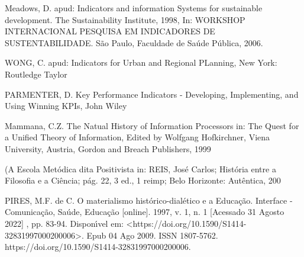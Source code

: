 \documentclass[
12pt,		%
openright,	%
twoside,  %
a4paper,			%
chapter=TITLE,		%
english,			%
french,				%
spanish,			%
brazil				%
]{USPSC-classe/USPSC}
\begin{document}
\begin{flushleft}
\begin{flushleft}
[MEADOWS, 2006] Meadows, D. apud: Indicators and information Systems for sustainable development. The Sustainability Institute, 1998, In: WORKSHOP INTERNACIONAL PESQUISA EM INDICADORES DE SUSTENTABILIDADE. S\~ao Paulo, Faculdade de Sa\'ude P\'ublica, 2006.
\end{flushleft}


\end{flushleft}


\begin{flushleft}
\begin{flushleft}
[WONG, 2006] WONG, C. apud: Indicators for Urban and Regional PLanning, New York: Routledge Taylor 
\end{flushleft}


\end{flushleft}


\begin{flushleft}
\begin{flushleft}
[PARMENTER, 2007] PARMENTER, D. Key Performance Indicators - Developing, Implementing, and Using Winning KPIs, John Wiley 
\end{flushleft}


\end{flushleft}


\begin{flushleft}
\begin{flushleft}
[MAMMANA, 1999] Mammana, C.Z. The Natual History of Information Processors in: The Quest for a Unified Theory of Information, Edited by Wolfgang Hofkirchner, Viena University, Austria, Gordon and Breach Publishers, 1999
\end{flushleft}


\end{flushleft}


\begin{flushleft}
\begin{flushleft}
[REIS , 2006] (A Escola Met\'odica dita Positivista in: REIS, Jos\'e Carlos; Hist\'oria entre a Filosofia e a Ci\^encia; p\'ag. 22, 3 ed., 1 reimp; Belo Horizonte: Aut\^entica, 200
\end{flushleft}


\end{flushleft}


\begin{flushleft}
\begin{flushleft}
[Pires, 2009] PIRES, M.F. de C. O materialismo hist\'orico-dial\'etico e a Educa\c{c}\~ao. Interface - Comunica\c{c}\~ao, Sa\'ude, Educa\c{c}\~ao [online]. 1997, v. 1, n. 1 [Acessado 31 Agosto 2022] , pp. 83-94. Dispon\'{\i}vel em: <https://doi.org/10.1590/S1414-32831997000200006>. Epub 04 Ago 2009. ISSN 1807-5762. https://doi.org/10.1590/S1414-32831997000200006.
\end{flushleft}


\end{flushleft}
\end{document}
